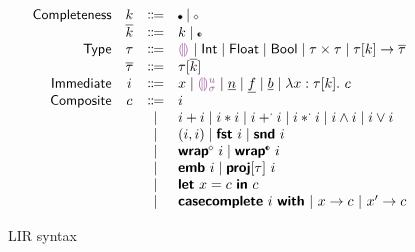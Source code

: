 \documentclass[index.tex]{subfiles}
\begin{document}
\begin{figure}
  \[\begin{array}{rccl}
    \SortNComplete & \SortNCompleteVar & \Coloneqq & \CNC \mid \CNI \\
    \SortComplete  & \SortCompleteVar  & \Coloneqq & \SortNCompleteVar \mid \CII \\
    \SortTypCon    & \SortTypConVar    & \Coloneqq & \TCHole \mid \TCInt \mid \TCFloat \mid \TCBool 
                                                   \mid \TCPair{\SortTypConVar}{\SortTypConVar} 
                                                   \mid \TCFun{\TMk{\SortTypConVar}{\SortNCompleteVar}}{\SortTypVar} \\
    \SortTyp       & \SortTypVar       & \Coloneqq & \TMk{\SortTypConVar}{\SortCompleteVar} \\
    \SortImm       & \SortImmVar       & \Coloneqq & x \mid \EEHole{\SortHoleIdVar}{\SortHoleEnvVar}
                                                   \mid \EIntLit \mid \EFloatLit \mid \EBoolLit 
                                                   \mid \EFun{x}{\TMk{\SortTypConVar}{\SortNCompleteVar}}{\SortCompVar} \\
    \SortComp      & \SortCompVar      & \Coloneqq & \SortImmVar \\
                   &                   & \mid         & \EPlus{\SortImmVar}{\SortImmVar} 
                                                   \mid \ETimes{\SortImmVar}{\SortImmVar}
                                                   \mid \EFPlus{\SortImmVar}{\SortImmVar} 
                                                   \mid \EFTimes{\SortImmVar}{\SortImmVar}
                                                   \mid \EAnd{\SortImmVar}{\SortImmVar}
                                                   \mid \EOr{\SortImmVar}{\SortImmVar} \\
                   &                   & \mid         & \EPair{\SortImmVar}{\SortImmVar}
                                                   \mid \EProjL{\SortImmVar}
                                                   \mid \EProjR{\SortImmVar} \\
                   &                   & \mid         & \EWrapIntoNI{\SortImmVar}
                                                   \mid \EWrapIntoII{\SortImmVar} \\
                   &                   & \mid         & \EEmbed{\SortImmVar}
                                                   \mid \EProj{\SortImmVar}{\SortTypConVar} \\
                   &                   & \mid         & \ELet{x}{\SortCompVar} \EInn{\SortCompVar} \\
                   &                   & \mid         & \ECaseCompleteWith{\SortImmVar}
                                                    ~\ECaseCompleteBranch{x}{\SortCompVar}
                                                    ~\ECaseCompleteBranch{x'}{\SortCompVar}
  \end{array}\]
  \caption{LIR syntax}
  \label{fig:lir-syntax}
\end{figure}
\end{document}
